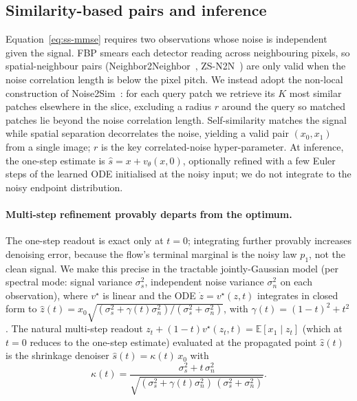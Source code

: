 \documentclass[letterpaper]{article} %
\begin{document}
\subsection{Similarity-based pairs and inference}
\label{sec:ss-pairs}
Equation~\eqref{eq:ss-mmse} requires two observations whose noise is
independent given the signal.  FBP smears each detector reading across
neighbouring pixels, so spatial-neighbour pairs
(Neighbor2Neighbor~\cite{huang2021neighbor2neighbor},
ZS-N2N~\cite{mansour2023zsn2n}) are only valid when the noise correlation
length is below the pixel pitch.  We instead adopt the non-local
construction of Noise2Sim~\cite{niu2020noise2sim}: for each query patch we
retrieve its $K$ most similar patches elsewhere in the slice, excluding
a radius $r$ around the query so matched patches lie beyond the noise
correlation length.  Self-similarity matches the signal while spatial
separation decorrelates the noise, yielding a valid pair $(x_0,x_1)$ from a
single image; $r$ is the key correlated-noise hyper-parameter.  At
inference, the one-step estimate is $\hat s = x + v_\theta(x,0)$, optionally
refined with a few Euler steps of the learned ODE initialised at the noisy
input; we do not integrate to the noisy endpoint distribution.

\paragraph{Multi-step refinement provably departs from the optimum.}
The one-step readout is exact only at $t{=}0$; integrating further
provably increases denoising error, because the flow's terminal marginal is the
noisy law $p_1$, not the clean signal.  We make this precise in the
tractable jointly-Gaussian model (per spectral mode: signal variance
$\sigma_s^2$, independent noise variance $\sigma_n^2$ on each observation), where
$v^\star$ is linear and the ODE $\dot z=v^\star(z,t)$ integrates in closed form to
$\hat z(t)=x_0\sqrt{(\sigma_s^2+\gamma(t)\sigma_n^2)/(\sigma_s^2+\sigma_n^2)}$,
with $\gamma(t)=(1-t)^2+t^2$.  The natural multi-step readout
$z_t+(1-t)v^\star(z_t,t)=\mathbb{E}[x_1\mid z_t]$ (which at $t{=}0$ reduces to the
one-step estimate) evaluated at the propagated point $\hat z(t)$ is the shrinkage
denoiser $\hat s(t)=\kappa(t)\,x_0$ with
\begin{equation}
  \kappa(t)=\frac{\sigma_s^2+t\,\sigma_n^2}
                 {\sqrt{(\sigma_s^2+\gamma(t)\sigma_n^2)\,(\sigma_s^2+\sigma_n^2)}}.
  \label{eq:kappa}
\end{equation}
\end{document}
